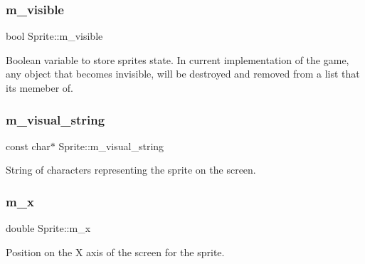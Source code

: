 \mbox{\label{classSprite_ad0254af9247c4e1d5d220bb89b3ef745}} 
\subsubsection{\texorpdfstring{m\+\_\+visible}{m\_visible}}
{\footnotesize\ttfamily bool Sprite\+::m\+\_\+visible\hspace{0.3cm}{\ttfamily [protected]}}

Boolean variable to store sprite\textquotesingle{}s state. In current implementation of the game, any object that becomes invisible, will be destroyed and removed from a list that it\textquotesingle{}s memeber of. \mbox{\label{classSprite_adf82741e0c96c05cdd1c96ceda8df837}} 
\subsubsection{\texorpdfstring{m\+\_\+visual\+\_\+string}{m\_visual\_string}}
{\footnotesize\ttfamily const char$\ast$ Sprite\+::m\+\_\+visual\+\_\+string\hspace{0.3cm}{\ttfamily [protected]}}



String of characters representing the sprite on the screen. 

\mbox{\label{classSprite_ac0a1a6a0c8fce6f46b30152b263fd2a9}} 
\subsubsection{\texorpdfstring{m\+\_\+x}{m\_x}}
{\footnotesize\ttfamily double Sprite\+::m\+\_\+x\hspace{0.3cm}{\ttfamily [protected]}}



Position on the X axis of the screen for the sprite. 

\mbox{\label{classSprite_adc245ad211b04b31cd234fb080b4b034}} 
